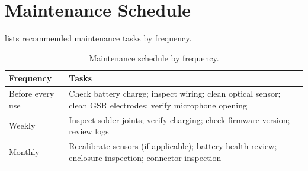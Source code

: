 \section{Maintenance Schedule}
\label{sec:maintenance-schedule}

 lists recommended maintenance tasks by frequency.

\begin{table}[H]
\centering
\caption{Maintenance schedule by frequency.}
\label{tab:maintenance-schedule}
\small
\begin{tabularx}{\columnwidth}{@{}l Y@{}}
\toprule
\textbf{Frequency} & \textbf{Tasks} \\
\midrule
Before every use & Check battery charge; inspect wiring; clean optical sensor; clean GSR electrodes; verify microphone opening \\
Weekly & Inspect solder joints; verify charging; check firmware version; review logs \\
Monthly & Recalibrate sensors (if applicable); battery health review; enclosure inspection; connector inspection \\
\bottomrule
\end{tabularx}
\end{table}
